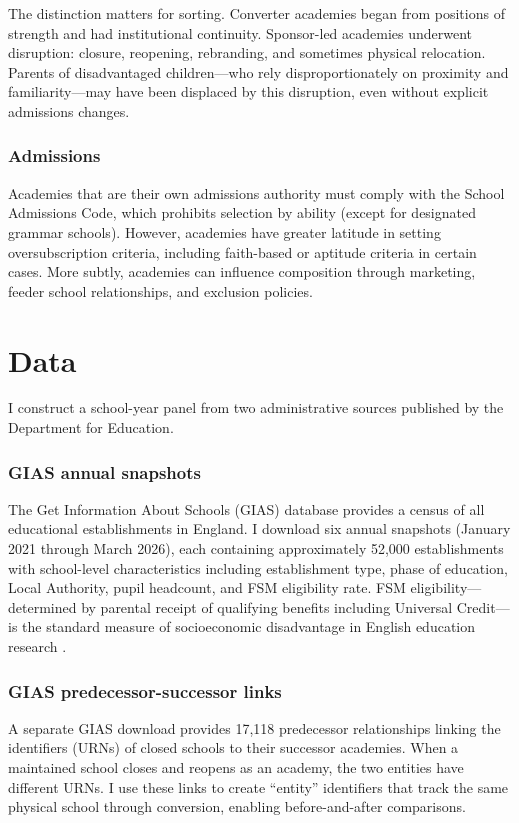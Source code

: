 \documentclass[12pt]{article}
\begin{document}
The distinction matters for sorting. Converter academies began from positions of strength and had institutional continuity. Sponsor-led academies underwent disruption: closure, reopening, rebranding, and sometimes physical relocation. Parents of disadvantaged children---who rely disproportionately on proximity and familiarity---may have been displaced by this disruption, even without explicit admissions changes.

\subsubsection*{Admissions} Academies that are their own admissions authority must comply with the School Admissions Code, which prohibits selection by ability (except for designated grammar schools). However, academies have greater latitude in setting oversubscription criteria, including faith-based or aptitude criteria in certain cases. More subtly, academies can influence composition through marketing, feeder school relationships, and exclusion policies.

\section{Data}

I construct a school-year panel from two administrative sources published by the Department for Education.

\subsubsection*{GIAS annual snapshots} The Get Information About Schools (GIAS) database provides a census of all educational establishments in England. I download six annual snapshots (January 2021 through March 2026), each containing approximately 52,000 establishments with school-level characteristics including establishment type, phase of education, Local Authority, pupil headcount, and FSM eligibility rate. FSM eligibility---determined by parental receipt of qualifying benefits including Universal Credit---is the standard measure of socioeconomic disadvantage in English education research \citep{hobbs2019}.

\subsubsection*{GIAS predecessor-successor links} A separate GIAS download provides 17,118 predecessor relationships linking the identifiers (URNs) of closed schools to their successor academies. When a maintained school closes and reopens as an academy, the two entities have different URNs. I use these links to create ``entity'' identifiers that track the same physical school through conversion, enabling before-and-after comparisons.
\end{document}
